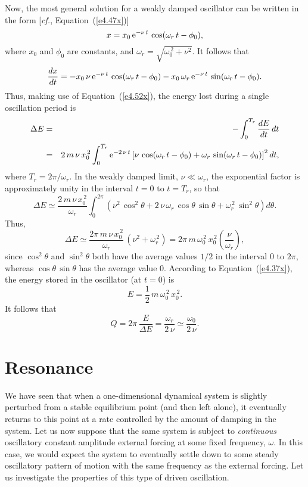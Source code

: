 Now, the most general solution for a weakly damped 
oscillator can be written in the form
[{\em cf.}, Equation~(\ref{e4.47x})]
\begin{equation}
x = x_0\,{\rm e}^{-\nu\,t}\,\cos(\omega_r\,t-\phi_0),
\end{equation}
where $x_0$ and $\phi_0$ are constants, and $\omega_r=\sqrt{\omega_0^{\,2}+\nu^2}$. It follows that
\begin{equation}
\frac{dx}{dt} =- x_0\,\nu\,{\rm e}^{-\nu\,t}\,\cos(\omega_r\,t-\phi_0)-
x_0\,\omega_r\,{\rm e}^{-\nu\,t}\,\sin(\omega_r\,t-\phi_0).
\end{equation}
Thus, making use of Equation~(\ref{e4.52x}), the energy lost during a single oscillation period is
\begin{eqnarray}
\Delta E &=& -\int_0^{T_r} \frac{dE}{dt}\,dt\\[0.5ex]
&=& 2\,m\,\nu\,x_0^{\,2}\int_0^{T_r}{\rm e}^{-2\,\nu\,t}\left[\nu\,\cos(\omega_r\,t-\phi_0) + \omega_r\,\sin(\omega_r\,t-\phi_0)\right]^2 dt,\nonumber
\end{eqnarray}
where $T_r=2\pi/\omega_r$. 
In the weakly damped limit, $\nu\ll \omega_r$, the exponential factor is approximately
unity in the interval $t=0$ to $t=T_r$, so that
\begin{equation}
\Delta E \simeq \frac{2\,m\,\nu\,x_0^{\,2}}{\omega_r}\int_0^{2\pi} \left(
\nu^2\,\cos^2\theta + 2\,\nu\,\omega_r\,\cos\theta\,\sin\theta + \omega_r^{\,2}\,\sin^2\theta\right)d\theta.
\end{equation}
Thus,
\begin{equation}
\Delta E \simeq \frac{2\pi\,m\,\nu\,x_0^{\,2}}{\omega_r}\,(\nu^2+\omega_r^{\,2}) =2 \pi\,m\,\omega_0^{\,2}\,x_0^{\,2}\left(\frac{\nu}{\omega_r}\right),
\end{equation}
since  $\cos^2\theta$ and $\sin^2\theta$ both have the average values $1/2$ in the interval
$0$ to $2\pi$, whereas  $\cos\theta\,\sin\theta$ has the average value $0$. 
According to Equation~(\ref{e4.37x}), the energy stored in the oscillator
(at $t=0$) is
\begin{equation}
E = \frac{1}{2}\,m\,\omega_0^{\,2}\,x_0^{\,2}.
\end{equation}
It follows that
\begin{equation}
Q = 2\pi\,\frac{E}{\Delta E} = \frac{\omega_r}{2\,\nu}\simeq \frac{\omega_0}{2\,\nu}.
\end{equation}

\section{Resonance}\label{eres}
We have seen that when a one-dimensional dynamical system is slightly perturbed
from a stable equilibrium point (and then left alone), it eventually returns to this point at
a rate controlled by the amount of damping in the system. Let us now
suppose that the same system is subject to {\em continuous}\/ oscillatory constant amplitude
external forcing at some fixed frequency, $\omega$. In this
case, we would expect the system to eventually settle down to some steady oscillatory pattern of motion
with the same frequency as the external forcing. Let us investigate the properties of this type of driven oscillation.

